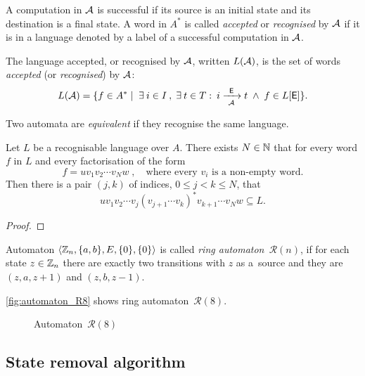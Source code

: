 A computation in ${\mathcal{A}}$ is successful if its source is an initial state and its destination is a final state. A word in $A^*$ is called \emph{accepted} or \emph{recognised} by ${\mathcal{A}}$ if it is in a language denoted by a label of a successful computation in ${\mathcal{A}}$.

\begin{defn}
    The language accepted, or recognised by ${\mathcal{A}}$, written $L({\mathcal{A}})$, is the set of words \emph{accepted} (or \emph{recognised}) by ${\mathcal{A}}$:
    \[
        L({\mathcal{A}}) = \{ f \in A^* \mid \; \exists \: i \in I \: , \; \exists \: t \in T : \: i {\; \xrightarrow[{\mathcal{A}}]{\: \; {\mathsf{E}} \: \;} \;} t \; \wedge \; f \in L[{\mathsf{E}}] \}.
    \]
\end{defn}

Two automata are \emph{equivalent} if they recognise the same language.

\begin{lemma}\label{lm:block_star_lemma}
    Let $L$ be a recognisable language over $A$. There exists $N \in \mathbb{N}$ that for every word $f$ in $L$ and every factorisation of the form
    \[
        f = u v_1 v_2 \dotsm v_N w \; , \quad \text{where every $v_i$ is a non-empty word.}
    \]
    Then there is a pair $(j,k)$ of indices, $0 \leq j < k \leq N$, that
    \[
        u v_1 v_2 \dotsm v_j {(v_{j+1} \dotsm v_k)}^* v_{k+1} \dotsm v_N w \subseteq L.
    \]
\end{lemma}

\begin{proof}
\end{proof}

\begin{defn}
    Automaton $\langle \mathbb{Z}_n, \{a,b\}, E, \{0\}, \{0\} \rangle$ is called \emph{ring automaton~${\mathcal{R}(n)}$}, if for each state $z \in \mathbb{Z}_n$ there are exactly two transitions with $z$ as a~source and they are $(z, a, z+1)$ and $(z, b, z-1)$.
\end{defn}

\begin{example}
    \autoref*{fig:automaton_R8} shows ring automaton~${\mathcal{R}(8)}$.

    \begin{figure}[h]
        \centering
        
        \caption{Automaton~${\mathcal{R}(8)}$}\label{fig:automaton_R8}
    \end{figure}
\end{example}

\subsection{State removal algorithm}


